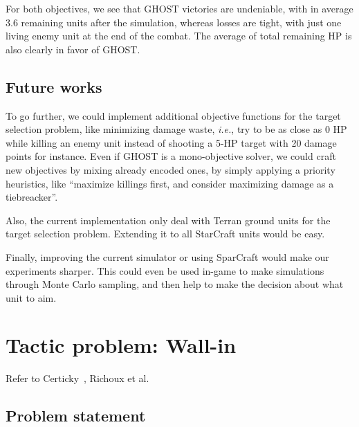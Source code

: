 \documentclass[journal]{IEEEtran}
\newcommand{\ghost}{\textsc{GHOST}\xspace}
\newcommand{\ie}{\textit{i.e.}}
\begin{document}
For both objectives, we see that \ghost victories are undeniable, with
in average  3.6 remaining units  after the simulation,  whereas losses
are  tight,  with  just one  living  enemy  unit  at  the end  of  the
combat. The average of total remaining  HP is also clearly in favor of
\ghost.

\subsection{Future works}

To go further,  we could implement additional  objective functions for
the target selection  problem, like minimizing damage  waste, \ie, try
to be as close as 0 HP while killing an enemy unit instead of shooting
a 5-HP target with 20 damage points  for instance. Even if \ghost is a
mono-objective solver, we could craft new objectives by mixing already
encoded  ones,   by  simply  applying  a   priority  heuristics,  like
``maximize  killings  first,  and  consider  maximizing  damage  as  a
tiebreacker''.

Also, the  current implementation only  deal with Terran  ground units
for the target selection problem.  Extending it to all StarCraft units
would be easy.

Finally, improving the current simulator or using SparCraft would make
our  experiments sharper.   This could  even be  used in-game  to make
simulations through  Monte Carlo sampling,  and then help to  make the
decision about what unit to aim.

\section{Tactic problem: Wall-in}\label{sec:wall}
Refer to Certicky~\cite{Certicky13}, Richoux et al.~\cite{RichouxUO14}
\subsection{Problem statement}
\end{document}
